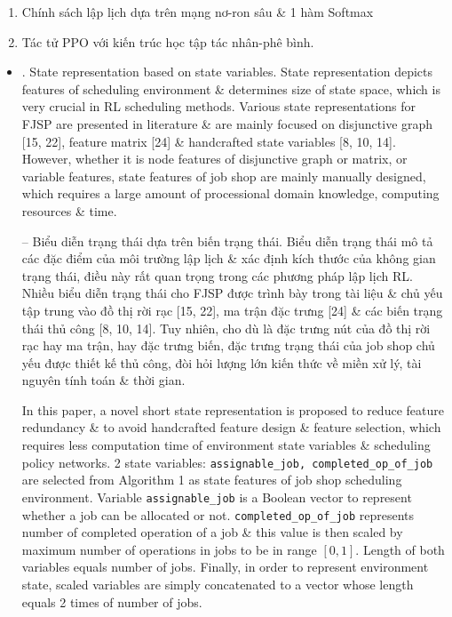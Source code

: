 \documentclass{article}
\begin{document}
\begin{itemize}
\begin{enumerate}
        \item Chính sách lập lịch dựa trên mạng nơ-ron sâu \& 1 hàm Softmax
        \item Tác tử PPO với kiến trúc học tập tác nhân-phê bình.
    \end{enumerate}
    \begin{itemize}
        \item {. State representation based on state variables.} State representation depicts features of scheduling environment \& determines size of state space, which is very crucial in RL scheduling methods. Various state representations for FJSP are presented in literature \& are mainly focused on disjunctive graph [15, 22], feature matrix [24] \& handcrafted state variables [8, 10, 14]. However, whether it is node features of disjunctive graph or matrix, or variable features, state features of job shop are mainly manually designed, which requires a large amount of processional domain knowledge, computing resources \& time.

        -- {\sf Biểu diễn trạng thái dựa trên biến trạng thái.} Biểu diễn trạng thái mô tả các đặc điểm của môi trường lập lịch \& xác định kích thước của không gian trạng thái, điều này rất quan trọng trong các phương pháp lập lịch RL. Nhiều biểu diễn trạng thái cho FJSP được trình bày trong tài liệu \& chủ yếu tập trung vào đồ thị rời rạc [15, 22], ma trận đặc trưng [24] \& các biến trạng thái thủ công [8, 10, 14]. Tuy nhiên, cho dù là đặc trưng nút của đồ thị rời rạc hay ma trận, hay đặc trưng biến, đặc trưng trạng thái của job shop chủ yếu được thiết kế thủ công, đòi hỏi lượng lớn kiến thức về miền xử lý, tài nguyên tính toán \& thời gian.

        In this paper, a novel short state representation is proposed to reduce feature redundancy \& to avoid handcrafted feature design \& feature selection, which requires less computation time of environment state variables \& scheduling policy networks. 2 state variables: \verb|assignable_job, completed_op_of_job| are selected from Algorithm 1 as state features of job shop scheduling environment. Variable \verb|assignable_job| is a Boolean vector to represent whether a job can be allocated or not. \verb|completed_op_of_job| represents number of completed operation of a job \& this value is then scaled by maximum number of operations in jobs to be in range $[0,1]$. Length of both variables equals number of jobs. Finally, in order to represent environment state, scaled variables are simply concatenated to a vector whose length equals 2 times of number of jobs.


\end{itemize}
\end{itemize}
\end{document}
